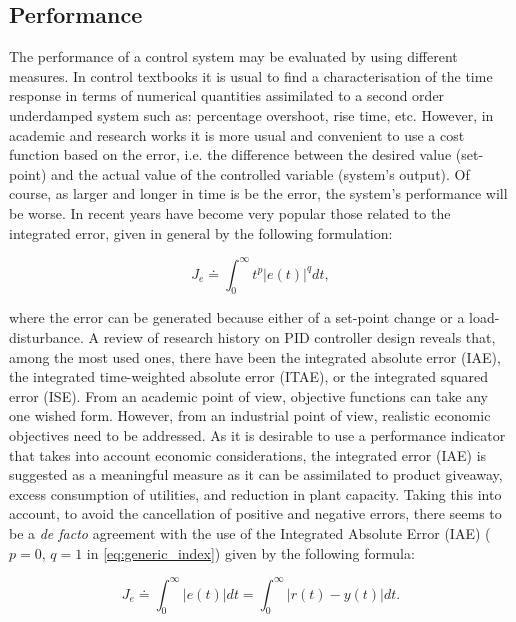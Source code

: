  \subsection{Performance}

The performance of a control system may be evaluated by using different measures. In control textbooks it is usual to find a characterisation of the time response in terms of numerical quantities assimilated to a second order underdamped system such as: percentage overshoot, rise time, etc. However, in academic and research works it is more usual and convenient to use a cost function based on the error, i.e. the difference between the desired value (set-point) and the actual value of the controlled variable (system's output).  Of course, as larger and longer in time is be the error, the system's performance will be worse. In recent years have become very popular those related to the integrated error, given in general by the following formulation:
 
\begin{equation}
	J_{e} \doteq \int^{\infty}_{0} t^p \left|e(t)\right|^q dt,  \label{eq:generic_index}
\end{equation}

\noindent where the error can be generated because either of a set-point change or a load-disturbance.
A review of research history on PID controller design reveals that, among the most used ones, there have been the integrated absolute error (IAE), the integrated time-weighted absolute error (ITAE), or the integrated squared error (ISE). From an academic point of view, objective functions can take any one wished form. However, from an industrial point of view, realistic economic objectives need to be addressed. As it is desirable to use a performance indicator that takes into account economic considerations, the integrated error (IAE) is suggested \citet{Shinskey2002} as a meaningful measure as it can be assimilated to product giveaway, excess consumption of utilities, and reduction in plant capacity. Taking this into account, to avoid the cancellation of positive and negative errors, there seems to be a \emph{de facto} agreement with the use of the Integrated Absolute Error (IAE) ($p=0$, $q=1$ in \ref{eq:generic_index}) given by the following formula:

\begin{equation}
	J_e \doteq \int^{\infty}_{0} \left|e(t) \right| dt = \int^{\infty}_{0} \left|r(t)-y(t) \right| dt. 
\end{equation}





